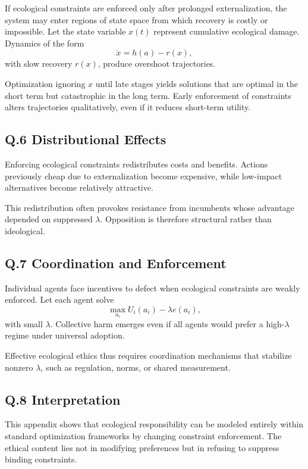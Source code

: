 \documentclass[11pt]{article}
\begin{document}
If ecological constraints are enforced only after prolonged externalization, the system may enter regions of state space from which recovery is costly or impossible. Let the state variable \(x(t)\) represent cumulative ecological damage. Dynamics of the form
\[
\dot{x} = h(a) - r(x),
\]
with slow recovery \(r(x)\), produce overshoot trajectories.

Optimization ignoring \(x\) until late stages yields solutions that are optimal in the short term but catastrophic in the long term. Early enforcement of constraints alters trajectories qualitatively, even if it reduces short-term utility.

\subsection{Q.6 Distributional Effects}

Enforcing ecological constraints redistributes costs and benefits. Actions previously cheap due to externalization become expensive, while low-impact alternatives become relatively attractive.

This redistribution often provokes resistance from incumbents whose advantage depended on suppressed \(\lambda\). Opposition is therefore structural rather than ideological.

\subsection{Q.7 Coordination and Enforcement}

Individual agents face incentives to defect when ecological constraints are weakly enforced. Let each agent solve
\[
\max_{a_i} U_i(a_i) - \lambda e(a_i),
\]
with small \(\lambda\). Collective harm emerges even if all agents would prefer a high-\(\lambda\) regime under universal adoption.

Effective ecological ethics thus requires coordination mechanisms that stabilize nonzero \(\lambda\), such as regulation, norms, or shared measurement.

\subsection{Q.8 Interpretation}

This appendix shows that ecological responsibility can be modeled entirely within standard optimization frameworks by changing constraint enforcement. The ethical content lies not in modifying preferences but in refusing to suppress binding constraints.
\end{document}
